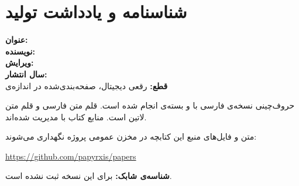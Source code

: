 \chapter*{شناسنامه و یادداشت تولید}

\noindent
\textbf{عنوان:} \BookletTitle\\
\textbf{نویسنده:} \BookletAuthor\\
\textbf{ویرایش:} \BookletEdition\\
\textbf{سال انتشار:} \BookletYear\\
\textbf{قطع:} رقعی دیجیتال، صفحه‌بندی‌شده در اندازه‌ی 

\medskip
\noindent
حروف‌چینی نسخه‌ی فارسی با  و بسته‌ی 
انجام شده است. قلم متن فارسی  و قلم متن لاتین
 است. منابع کتاب با  مدیریت
شده‌اند.

\medskip
\noindent
متن و فایل‌های منبع این کتابچه در مخزن عمومی پروژه نگهداری می‌شوند:
\begin{center}
\url{https://github.com/papyrxis/papers}
\end{center}

\noindent
\textbf{شناسه‌ی شابک:} برای این نسخه ثبت نشده است.
